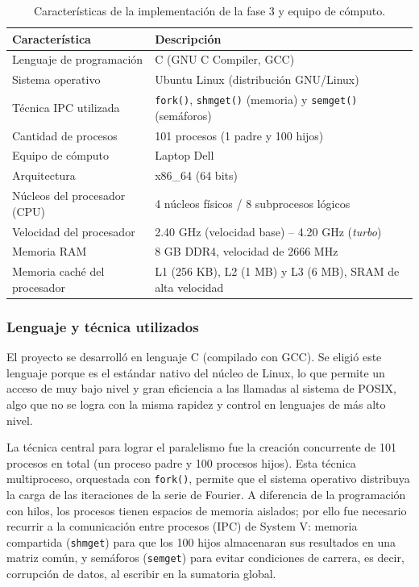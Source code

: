 \begin{table}[H]
    \centering
    \caption{Características de la implementación de la fase 3 y equipo de cómputo.}
    \label{tab:cap03:maga:caracteristicas}
    \begin{tabular}{p{}p{}}
        \toprule
        \textbf{Característica} & \textbf{Descripción} \\
        \midrule
        Lenguaje de programación & C (GNU C Compiler, GCC) \\
        Sistema operativo & Ubuntu Linux (distribución GNU/Linux) \\
        Técnica IPC utilizada & \texttt{fork()}, \texttt{shmget()} (memoria) y \texttt{semget()} (semáforos) \\
        Cantidad de procesos & 101 procesos (1 padre y 100 hijos) \\
        Equipo de cómputo & Laptop Dell \\
        Arquitectura & x86\_64 (64 bits) \\
        Núcleos del procesador (CPU) & 4 núcleos físicos / 8 subprocesos lógicos \\
        Velocidad del procesador & 2.40 GHz (velocidad base) -- 4.20 GHz (\textit{turbo}) \\
        Memoria RAM & 8 GB DDR4, velocidad de 2666 MHz \\
        Memoria caché del procesador & L1 (256 KB), L2 (1 MB) y L3 (6 MB), SRAM de alta velocidad \\
        \bottomrule
    \end{tabular}
\end{table}

\subsubsection{Lenguaje y técnica utilizados}
\label{sec:cap03:maga:tecnica}

El proyecto se desarrolló en lenguaje C (compilado con GCC). Se eligió este lenguaje porque es el estándar nativo del núcleo de Linux, lo que permite un acceso de muy bajo nivel y gran eficiencia a las llamadas al sistema de POSIX, algo que no se logra con la misma rapidez y control en lenguajes de más alto nivel.

La técnica central para lograr el paralelismo fue la creación concurrente de 101 procesos en total (un proceso padre y 100 procesos hijos). Esta técnica multiproceso, orquestada con \texttt{fork()}, permite que el sistema operativo distribuya la carga de las iteraciones de la serie de Fourier. A diferencia de la programación con hilos, los procesos tienen espacios de memoria aislados; por ello fue necesario recurrir a la comunicación entre procesos (IPC) de System V: memoria compartida (\texttt{shmget}) para que los 100 hijos almacenaran sus resultados en una matriz común, y semáforos (\texttt{semget}) para evitar condiciones de carrera, es decir, corrupción de datos, al escribir en la sumatoria global.

